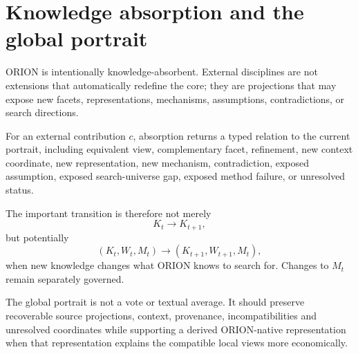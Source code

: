 \section{Knowledge absorption and the global portrait}

ORION is intentionally knowledge-absorbent. External disciplines are not extensions that automatically redefine the core; they are projections that may expose new facets, representations, mechanisms, assumptions, contradictions, or search directions.

For an external contribution $c$, absorption returns a typed relation to the current portrait, including equivalent view, complementary facet, refinement, new context coordinate, new representation, new mechanism, contradiction, exposed assumption, exposed search-universe gap, exposed method failure, or unresolved status.

The important transition is therefore not merely
\[
K_t\rightarrow K_{t+1},
\]
but potentially
\[
(K_t,W_t,M_t)\rightarrow(K_{t+1},W_{t+1},M_t),
\]
when new knowledge changes what ORION knows to search for. Changes to $M_t$ remain separately governed.

The global portrait is not a vote or textual average. It should preserve recoverable source projections, context, provenance, incompatibilities and unresolved coordinates while supporting a derived ORION-native representation when that representation explains the compatible local views more economically.
